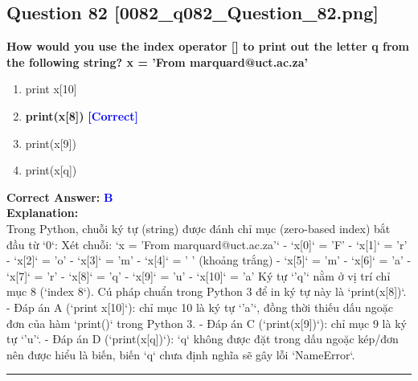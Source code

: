 \documentclass[11pt,a4paper]{article}
\begin{document}
\begin{minipage}{\textwidth}
\subsection*{Question 82 \quad \footnotesize{[0082_q082_Question_82.png]}}
\noindent \textbf{How would you use the index operator [] to print out the letter q from the following string? x = 'From marquard@uct.ac.za'}

\begin{enumerate}[label=\Alph*.]
    \item print x[10]
    \item \textbf{print(x[8])} \hfill \textcolor{blue}{\textbf{[Correct]}}
    \item print(x[9])
    \item print(x[q])
\end{enumerate}

\noindent \textbf{Correct Answer:} \textcolor{blue}{\textbf{B}} \\[4pt]
\noindent \textbf{Explanation:}\\
Trong Python, chuỗi ký tự (string) được đánh chỉ mục (zero-based index) bắt đầu từ `0`:\newline
Xét chuỗi: `x = 'From marquard@uct.ac.za'`\newline
- `x[0]` = 'F'\newline
- `x[1]` = 'r'\newline
- `x[2]` = 'o'\newline
- `x[3]` = 'm'\newline
- `x[4]` = ' ' (khoảng trắng)\newline
- `x[5]` = 'm'\newline
- `x[6]` = 'a'\newline
- `x[7]` = 'r'\newline
- `x[8]` = 'q'\newline
- `x[9]` = 'u'\newline
- `x[10]` = 'a'\newline
\newline
Ký tự `'q'` nằm ở vị trí chỉ mục 8 (`index 8`). Cú pháp chuẩn trong Python 3 để in ký tự này là `print(x[8])`.\newline
- Đáp án A (`print x[10]`): chỉ mục 10 là ký tự `'a'`, đồng thời thiếu dấu ngoặc đơn của hàm `print()` trong Python 3.\newline
- Đáp án C (`print(x[9])`): chỉ mục 9 là ký tự `'u'`.\newline
- Đáp án D (`print(x[q])`): `q` không được đặt trong dấu ngoặc kép/đơn nên được hiểu là biến, biến `q` chưa định nghĩa sẽ gây lỗi `NameError`.
\end{minipage}
\vspace{0.8cm}
\hrule
\vspace{0.5cm}
\end{document}
